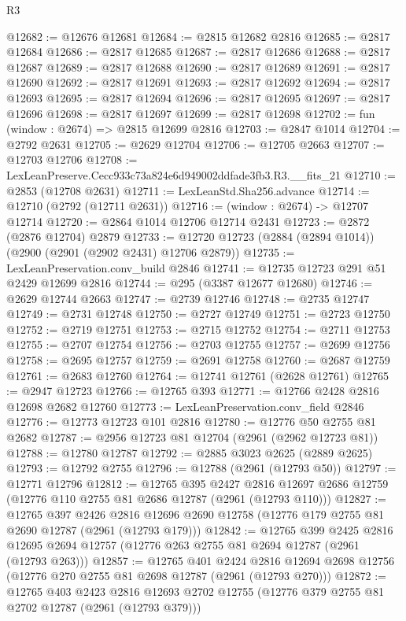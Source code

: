 \begin{lexlean}{R3}
\begin{coremodule}
@12682 := @12676 @12681
@12684 := @2815 @12682 @2816
@12685 := @2817 @12684
@12686 := @2817 @12685
@12687 := @2817 @12686
@12688 := @2817 @12687
@12689 := @2817 @12688
@12690 := @2817 @12689
@12691 := @2817 @12690
@12692 := @2817 @12691
@12693 := @2817 @12692
@12694 := @2817 @12693
@12695 := @2817 @12694
@12696 := @2817 @12695
@12697 := @2817 @12696
@12698 := @2817 @12697
@12699 := @2817 @12698
@12702 := fun (window : @2674) => @2815 @12699 @2816
@12703 := @2847 @1014
@12704 := @2792 @2631
@12705 := @2629 @12704
@12706 := @12705 @2663
@12707 := @12703 @12706
@12708 := LexLeanPreserve.Cecc933c73a824e6d949002ddfade3fb3.R3.__fits_21
@12710 := @2853 (@12708 @2631)
@12711 := LexLeanStd.Sha256.advance
@12714 := @12710 (@2792 (@12711 @2631))
@12716 := (window : @2674) -> @12707 @12714
@12720 := @2864 @1014 @12706 @12714 @2431
@12723 := @2872 (@2876 @12704) @2879
@12733 := @12720 @12723 (@2884 (@2894 @1014)) (@2900 (@2901 (@2902 @2431) @12706 @2879))
@12735 := LexLeanPreservation.conv_build @2846
@12741 := @12735 @12723 @291 @51 @2429 @12699 @2816
@12744 := @295 (@3387 @12677 @12680)
@12746 := @2629 @12744 @2663
@12747 := @2739 @12746
@12748 := @2735 @12747
@12749 := @2731 @12748
@12750 := @2727 @12749
@12751 := @2723 @12750
@12752 := @2719 @12751
@12753 := @2715 @12752
@12754 := @2711 @12753
@12755 := @2707 @12754
@12756 := @2703 @12755
@12757 := @2699 @12756
@12758 := @2695 @12757
@12759 := @2691 @12758
@12760 := @2687 @12759
@12761 := @2683 @12760
@12764 := @12741 @12761 (@2628 @12761)
@12765 := @2947 @12723
@12766 := @12765 @393
@12771 := @12766 @2428 @2816 @12698 @2682 @12760
@12773 := LexLeanPreservation.conv_field @2846
@12776 := @12773 @12723 @101 @2816
@12780 := @12776 @50 @2755 @81 @2682
@12787 := @2956 @12723 @81 @12704 (@2961 (@2962 @12723 @81))
@12788 := @12780 @12787
@12792 := @2885 @3023 @2625 (@2889 @2625)
@12793 := @12792 @2755
@12796 := @12788 (@2961 (@12793 @50))
@12797 := @12771 @12796
@12812 := @12765
    @395
    @2427
    @2816
    @12697
    @2686
    @12759
    (@12776 @110 @2755 @81 @2686 @12787 (@2961 (@12793 @110)))
@12827 := @12765
    @397
    @2426
    @2816
    @12696
    @2690
    @12758
    (@12776 @179 @2755 @81 @2690 @12787 (@2961 (@12793 @179)))
@12842 := @12765
    @399
    @2425
    @2816
    @12695
    @2694
    @12757
    (@12776 @263 @2755 @81 @2694 @12787 (@2961 (@12793 @263)))
@12857 := @12765
    @401
    @2424
    @2816
    @12694
    @2698
    @12756
    (@12776 @270 @2755 @81 @2698 @12787 (@2961 (@12793 @270)))
@12872 := @12765
    @403
    @2423
    @2816
    @12693
    @2702
    @12755
    (@12776 @379 @2755 @81 @2702 @12787 (@2961 (@12793 @379)))

\end{coremodule}
\end{lexlean}
